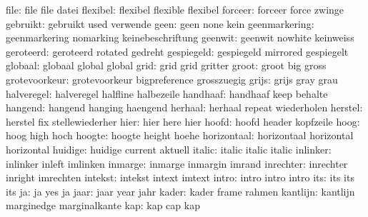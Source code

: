                file:  file                 file                datei
           flexibel:  flexibel             flexible            flexibel
            forceer:  forceer              force               zwinge
           gebruikt:  gebruikt             used                verwende
               geen:  geen                 none                kein
      geenmarkering:  geenmarkering        nomarking           keinebeschriftung
            geenwit:  geenwit              nowhite             keinweiss
          geroteerd:  geroteerd            rotated             gedreht
         gespiegeld:  gespiegeld           mirrored            gespiegelt
            globaal:  globaal              global              global
               grid:  grid                 grid                gritter
              groot:  groot                big                 gross
      grotevoorkeur:  grotevoorkeur        bigpreference       grosszuegig
              grijs:  grijs                gray                grau
         halveregel:  halveregel           halfline            halbezeile
           handhaaf:  handhaaf             keep                behalte
            hangend:  hangend              hanging             haengend
            herhaal:  herhaal              repeat              wiederholen
            herstel:  herstel              fix                 stellewiederher
               hier:  hier                 here                hier
              hoofd:  hoofd                header              kopfzeile
               hoog:  hoog                 high                hoch
             hoogte:  hoogte               height              hoehe
        horizontaal:  horizontaal          horizontal          horizontal
            huidige:  huidige              current             aktuell
             italic:  italic               italic              italic 
           inlinker:  inlinker             inleft              imlinken
            inmarge:  inmarge              inmargin            imrand
          inrechter:  inrechter            inright             imrechten
            intekst:  intekst              intext              imtext
              intro:  intro                intro               intro
                its:  its                  its                 its
                 ja:  ja                   yes                 ja
               jaar:  jaar                 year                jahr
              kader:  kader                frame               rahmen
           kantlijn:  kantlijn             marginedge          marginalkante
                kap:  kap                  cap                 kap
